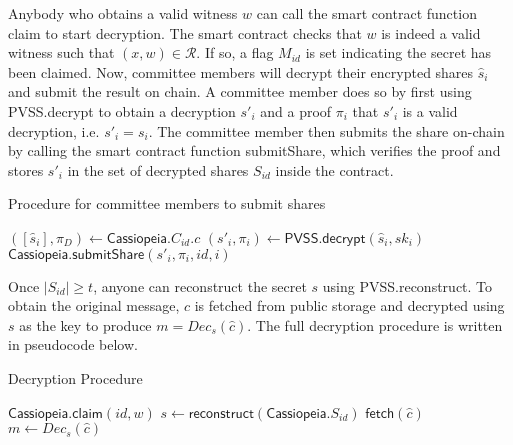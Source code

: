 Anybody who obtains a valid witness $w$ can call the smart contract function \textsf{claim} to start decryption.
The smart contract checks that $w$ is indeed a valid witness such that $(x, w) \in \mathcal{R}$.
If so, a flag $M_{id}$ is set indicating the secret has been claimed.
Now, committee members will decrypt their encrypted shares $\hat{s}_i$ and submit the result on chain.
A committee member does so by first using \textsf{PVSS.decrypt} to obtain a decryption $s'_i$ and a proof $\pi_i$ that $s'_i$ is a valid decryption, i.e. $s'_i = s_i$.
The committee member then submits the share on-chain by calling the smart contract function \textsf{submitShare}, which verifies the proof and stores $s'_i$ in the set of decrypted shares $S_{id}$ inside the contract.

\begin{algorithm}[H]
    \caption{Procedure for committee members to submit shares}
\label{alg:committee_member_no_incentives}
    \begin{algorithmic}[1]
            \State $([\hat{s}_i], \pi_D) \gets \textsf{Cassiopeia}.C_{id}.c$
            \State $(s'_i, \pi_i) \gets \textsf{PVSS.decrypt}(\hat{s}_i, sk_i)$
            \State $\textsf{Cassiopeia.submitShare}(s'_i, \pi_i, id, i)$
        \EndOn
    \end{algorithmic}
\end{algorithm}

Once $|S_{id}| \geq t$, anyone can reconstruct the secret $s$ using \textsf{PVSS.reconstruct}.
To obtain the original message, $\hat{c}$ is fetched from public storage and decrypted using $s$ as the key to produce $m = Dec_s(\hat{c})$.
The full decryption procedure is written in pseudocode below.

\begin{algorithm}[H]
    \caption{Decryption Procedure}
    \label{alg:decryption_no_incentives}
    \begin{algorithmic}[1]
            \State $\textsf{Cassiopeia.claim}(id, w)$
                \State $s \gets \textsf{reconstruct}(\textsf{Cassiopeia}.S_{id})$
                \State $\textsf{fetch}(\hat{c})$
                \State $m \gets Dec_s(\hat{c})$
            \EndOn
        \EndFunction
    \end{algorithmic}
\end{algorithm}

